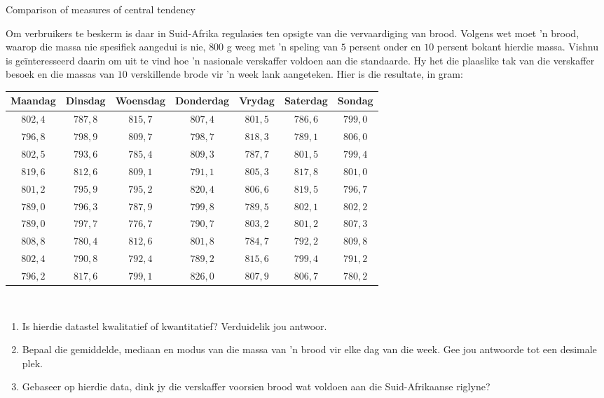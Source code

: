 \begin{wex}{Comparison of measures of central tendency}
{Om verbruikers te beskerm is daar in Suid-Afrika regulasies ten opsigte van die vervaardiging van brood. Volgens wet moet ’n brood, waarop die massa nie spesifiek aangedui is nie, $800$ g weeg met ’n speling van $5$ persent onder en $10$ persent bokant hierdie massa. Vishnu is geïnteresseerd daarin om uit te vind hoe ’n nasionale verskaffer voldoen aan die standaarde. Hy het die plaaslike tak van die verskaffer besoek en die massas van $10$ verskillende brode vir ’n week lank aangeteken. Hier is die resultate, in gram:\\

    \begin{center}
      \begin{tabular}{|c|c|c|c|c|c|c|} \hline
       
        \textbf{Maandag} & \textbf{Dinsdag} & \textbf{Woensdag} & \textbf{ Donderdag} & \textbf{Vrydag} & \textbf{Saterdag} & \textbf{Sondag} \\ \hline
        
        $802,4$ & $787,8$ & $815,7$ & $807,4$ & $801,5$ & $786,6$ & $799,0$ \\ \hline
        $796,8$ & $798,9$ & $809,7$ & $798,7$ & $818,3$ & $789,1$ & $806,0$ \\ \hline
        $802,5$ & $793,6$ & $785,4$ & $809,3$ & $787,7$ & $801,5$ & $799,4$ \\ \hline
        $819,6$ & $812,6$ & $809,1$ & $791,1$ & $805,3$ & $817,8$ & $801,0$ \\ \hline
        $801,2$ & $795,9$ & $795,2$ & $820,4$ & $806,6$ & $819,5$ & $796,7$ \\ \hline
        $789,0$ & $796,3$ & $787,9$ & $799,8$ & $789,5$ & $802,1$ & $802,2$ \\ \hline
        $789,0$ & $797,7$ & $776,7$ & $790,7$ & $803,2$ & $801,2$ & $807,3$ \\ \hline
        $808,8$ & $780,4$ & $812,6$ & $801,8$ & $784,7$ & $792,2$ & $809,8$ \\ \hline
        $802,4$ & $790,8$ & $792,4$ & $789,2$ & $815,6$ & $799,4$ & $791,2$ \\ \hline
        $796,2$ & $817,6$ & $799,1$ & $826,0$ & $807,9$ & $806,7$ & $780,2$ \\ \hline
       
      \end{tabular}
    \end{center}
\vspace{8pt}\\
    \begin{enumerate}[noitemsep, label=\textbf{\arabic*}.]
    \item Is hierdie datastel kwalitatief of kwantitatief? Verduidelik jou antwoor.
    \item Bepaal die gemiddelde, mediaan en modus van die massa van ’n brood vir elke dag van die week. Gee jou antwoorde tot een desimale plek.
    \item Gebaseer op hierdie data, dink jy die verskaffer voorsien brood wat voldoen aan die Suid-Afrikaanse riglyne?
    \end{enumerate}
}{

}
\end{wex}
